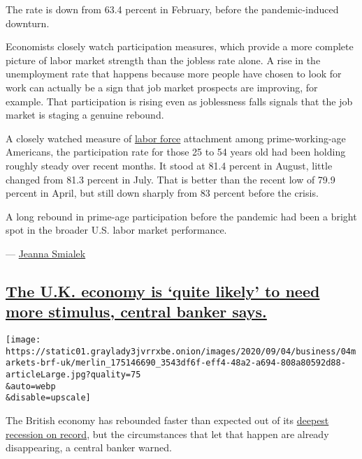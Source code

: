 The rate is down from 63.4 percent in February, before the
pandemic-induced downturn.

Economists closely watch participation measures, which provide a more
complete picture of labor market strength than the jobless rate alone. A
rise in the unemployment rate that happens because more people have
chosen to look for work can actually be a sign that job market prospects
are improving, for example. That participation is rising even as
joblessness falls signals that the job market is staging a genuine
rebound.

A closely watched measure of
\href{https://beta.bls.gov/dataViewer/view/timeseries/LNS11300060}{labor
force} attachment among prime-working-age Americans, the participation
rate for those 25 to 54 years old had been holding roughly steady over
recent months. It stood at 81.4 percent in August, little changed from
81.3 percent in July. That is better than the recent low of 79.9 percent
in April, but still down sharply from 83 percent before the crisis.

A long rebound in prime-age participation before the pandemic had been a
bright spot in the broader U.S. labor market performance.

--- \href{https://www.nytimes3xbfgragh.onion/by/jeanna-smialek}{Jeanna
Smialek}

\hypertarget{the-uk-economy-is-quite-likely-to-need-more-stimulus-central-banker-says}{%
\subsection{\texorpdfstring{\protect\hyperlink{the-uk-economy-is-quite-likely-to-need-more-stimulus-central-banker-says}{The
U.K. economy is `quite likely' to need more stimulus, central banker
says.}}{The U.K. economy is `quite likely' to need more stimulus, central banker says.}}\label{the-uk-economy-is-quite-likely-to-need-more-stimulus-central-banker-says}}

\texttt{[image: https://static01.graylady3jvrrxbe.onion/images/2020/09/04/business/04markets-brf-uk/merlin\_175146690\_3543df6f-eff4-48a2-a694-808a80592d88-articleLarge.jpg?quality=75\\\&auto=webp\\\&disable=upscale]}

The British economy has rebounded faster than expected out of its
\href{https://www.nytimes3xbfgragh.onion/2020/08/12/business/britain-economy-recession-coronavirus.html}{deepest
recession on record}, but the circumstances that let that happen are
already disappearing, a central banker warned.


